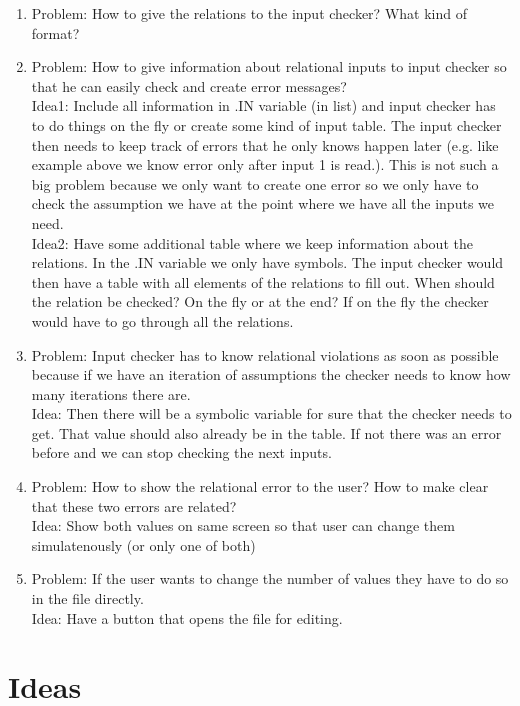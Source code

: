 \documentclass[11pt]{article}
\begin{document}
\begin{enumerate}
  \item Problem: How to give the relations to the input checker? What kind of format?
  \item Problem: How to give information about relational inputs to input checker so that he can easily check and create error messages?\\
  Idea1: Include all information in .IN variable (in list) and input checker has to do things on the fly or create some kind of input table. The input checker then needs to keep track of errors that he only knows happen later (e.g. like example above we know error only after input 1 is read.). This is not such a big problem because we only want to create one error so we only have to check the assumption we have at the point where we have all the inputs we need.\\
  Idea2: Have some additional table where we keep information about the relations. In the .IN variable we only have symbols. The input checker would then have a table with all elements of the relations to fill out. When should the relation be checked? On the fly or at the end? If on the fly the checker would have to go through all the relations.
  \item Problem: Input checker has to know relational violations as soon as possible because if we have an iteration of assumptions the checker needs to know how many iterations there are.\\
  Idea: Then there will be a symbolic variable for sure that the checker needs to get. That value should also already be in the table. If not there was an error before and we can stop checking the next inputs.
  \item Problem: How to show the relational error to the user? How to make clear that these two errors are related?\\
  Idea: Show both values on same screen so that user can change them simulatenously (or only one of both)
  \item Problem: If the user wants to change the number of values they have to do so in the file directly.\\
  Idea: Have a button that opens the file for editing.
\end{enumerate}


\section{Ideas}
\end{document}
